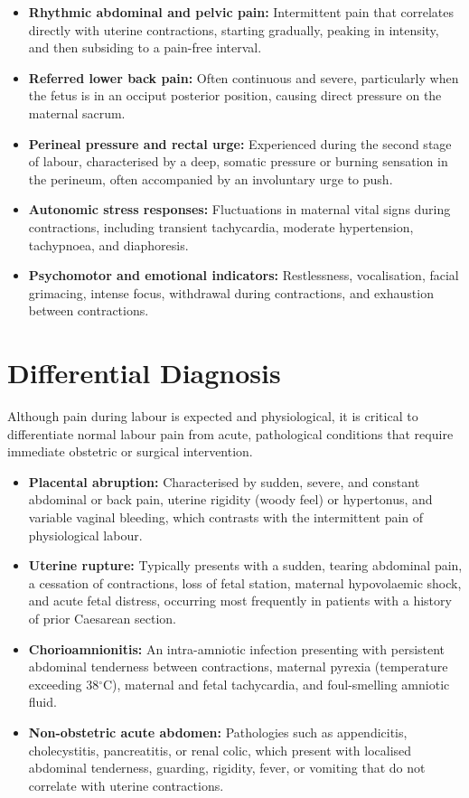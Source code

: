 \begin{itemize}
    \item \textbf{Rhythmic abdominal and pelvic pain:} Intermittent pain that correlates directly with uterine contractions, starting gradually, peaking in intensity, and then subsiding to a pain-free interval.
    \item \textbf{Referred lower back pain:} Often continuous and severe, particularly when the fetus is in an occiput posterior position, causing direct pressure on the maternal sacrum.
    \item \textbf{Perineal pressure and rectal urge:} Experienced during the second stage of labour, characterised by a deep, somatic pressure or burning sensation in the perineum, often accompanied by an involuntary urge to push.
    \item \textbf{Autonomic stress responses:} Fluctuations in maternal vital signs during contractions, including transient tachycardia, moderate hypertension, tachypnoea, and diaphoresis.
    \item \textbf{Psychomotor and emotional indicators:} Restlessness, vocalisation, facial grimacing, intense focus, withdrawal during contractions, and exhaustion between contractions.
\end{itemize}

\section*{Differential Diagnosis}
Although pain during labour is expected and physiological, it is critical to differentiate normal labour pain from acute, pathological conditions that require immediate obstetric or surgical intervention.

\begin{itemize}
    \item \textbf{Placental abruption:} Characterised by sudden, severe, and constant abdominal or back pain, uterine rigidity (woody feel) or hypertonus, and variable vaginal bleeding, which contrasts with the intermittent pain of physiological labour.
    \item \textbf{Uterine rupture:} Typically presents with a sudden, tearing abdominal pain, a cessation of contractions, loss of fetal station, maternal hypovolaemic shock, and acute fetal distress, occurring most frequently in patients with a history of prior Caesarean section.
    \item \textbf{Chorioamnionitis:} An intra-amniotic infection presenting with persistent abdominal tenderness between contractions, maternal pyrexia (temperature exceeding 38$^\circ$C), maternal and fetal tachycardia, and foul-smelling amniotic fluid.
    \item \textbf{Non-obstetric acute abdomen:} Pathologies such as appendicitis, cholecystitis, pancreatitis, or renal colic, which present with localised abdominal tenderness, guarding, rigidity, fever, or vomiting that do not correlate with uterine contractions.
\end{itemize}

